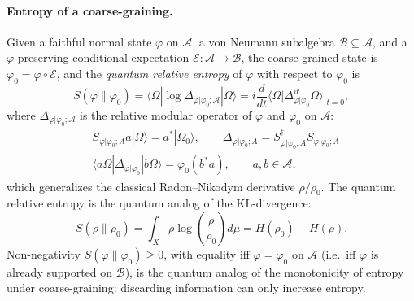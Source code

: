 \documentclass[a4paper,11pt]{article}
\theoremstyle{definition}
\theoremstyle{remark}
\newcommand{\mE}{\mathcal{E}}
\begin{document}
\paragraph{Entropy of a coarse-graining.}
Given a faithful normal state $\varphi$ on $\mathcal{A}$, a von Neumann subalgebra
$\mathcal{B}\subseteq\mathcal{A}$, and a $\varphi$-preserving conditional expectation
$\mE:\mathcal{A}\to\mathcal{B}$, the coarse-grained state is
$\varphi_0 = \varphi\circ \mE$, and the \emph{quantum relative entropy} of $\varphi$
with respect to $\varphi_0$ is
\begin{equation}
  S(\varphi\|\varphi_0)
  = \langle\Omega|\log\Delta_{\varphi|\varphi_0;\mathcal{A}} |\Omega\rangle
  =i\frac{d}{dt}\langle\Omega|\Delta_{\varphi|\varphi_0}^{it}\Omega\rangle\Big|_{t=0},
  \label{eq:relative-entropy}
\end{equation}
where $\Delta_{\varphi|\varphi_0;\mathcal{A}}$ is the relative modular operator of
$\varphi$ and $\varphi_0$ on $\mathcal{A}$:
\begin{align}
  &S_{\varphi|\varphi_0;A}a|\Omega\rangle=a^*|\Omega_0\rangle,\qquad
   \Delta_{\varphi|\varphi_0;A}=S^\dagger_{\varphi|\varphi_0;A}S_{\varphi|\varphi_0;A}
   \nonumber\\
  &\langle a\Omega|\Delta_{\varphi|\varphi_0}|b\Omega\rangle = \varphi_0(b^*a),
  \qquad a,b\in\mathcal{A},
  \label{eq:relative-modular}
\end{align}
which generalizes the classical Radon--Nikodym derivative $\rho/\rho_0$.  The quantum
relative entropy is the quantum analog of the KL-divergence:
\begin{equation}
  S(\rho\|\rho_0) = \int_X \rho\log\!\left(\frac{\rho}{\rho_0}\right)d\mu
  = H(\rho_0)-H(\rho).
  \label{eq:classical-KL}
\end{equation}
Non-negativity $S(\varphi\|\varphi_0)\geq 0$, with equality iff $\varphi=\varphi_0$ on
$\mathcal{A}$ (i.e.\ iff $\varphi$ is already supported on $\mathcal{B}$), is the
quantum analog of the monotonicity of entropy under coarse-graining: discarding
information can only increase entropy.
 
\end{document}
